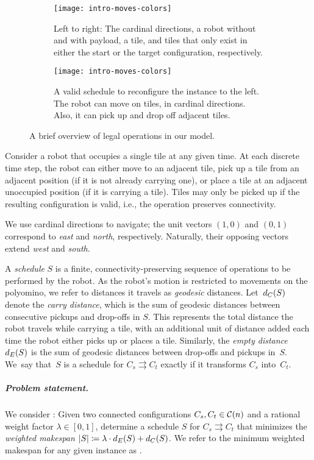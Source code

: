\begin{figure}[htb]
	\begin{subfigure}[t]{\columnwidth}
		\centering%
		\texttt{[image: intro-moves-colors]}%
		\caption{Left to right: The cardinal directions, a robot without and with payload, a tile, and tiles that only exist in either the start or the target configuration, respectively.}
		\label{fig:legend}
	\end{subfigure}%
	\vspace{2em}
	\begin{subfigure}[t]{\columnwidth}
		\centering%
		\texttt{[image: intro-moves-colors]}%
		\caption{A valid schedule to reconfigure the instance to the left.
		The robot can move on tiles, in cardinal directions.
		Also, it can pick up and drop off adjacent tiles.}
		\label{fig:example-schedule}
	\end{subfigure}%
	\caption{A brief overview of legal operations in our model.}
	\label{fig:preliminaries}
\end{figure}

Consider a robot that occupies a single tile at any given time.
At each discrete time step, the robot can either move to an adjacent tile, pick up a tile from an adjacent position (if it is not already carrying one), or place a tile at an adjacent unoccupied position (if it is carrying a tile).
Tiles may only be picked up if the resulting configuration is valid, i.e., the operation preserves connectivity.

We use cardinal directions to navigate;
the unit vectors $(1,0)$ and $(0,1)$ correspond to \emph{east} and \emph{north}, respectively.
Naturally, their opposing vectors extend \emph{west} and \emph{south}.

A \emph{schedule} $S$ is a finite, connectivity-preserving sequence of operations to be performed by the robot.
As the robot's motion is restricted to movements on the polyomino, we refer to distances it travels as \emph{geodesic} distances.
Let~$d_C(S)$ denote the \emph{carry distance}, which is the sum of geodesic distances between consecutive pickups and drop-offs in $S$.
This represents the total distance the robot travels while carrying a tile, with an additional unit of distance added each time the robot either picks up or places a tile.
Similarly, the \emph{empty distance} $d_E(S)$ is the sum of geodesic distances between drop-offs and pickups in~$S$.
We~say that~$S$ is a schedule for ${C_s\rightrightarrows C_t}$ exactly if it transforms $C_s$ into~$C_t$.

\subparagraph*{Problem statement.}
We consider \probName:
Given two connected configurations $C_s,C_t\in\mathcal{C}(n)$ and a rational weight factor $\lambda\in[0,1]$,
determine a schedule $S$ for $C_s\rightrightarrows C_t$ that minimizes the \emph{weighted makespan}
$|S| \coloneqq \lambda\cdot d_E(S) + d_C(S)$.
We refer to the minimum weighted makespan for any given instance as \OPT.
